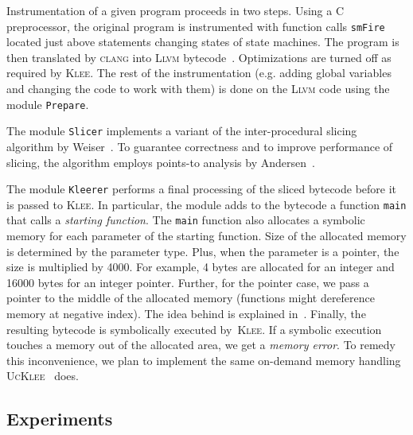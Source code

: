 \documentclass[10pt]{llncs}
\newcommand{\todol}[1]{{\scriptsize{{\textcolor{red}{[#1]}}}}}
\begin{document}
Instrumentation of a given program proceeds in two steps. Using a C
preprocessor, the original program is instrumented with function calls
\texttt{smFire} located just above statements changing states of state
machines. The program is then translated by \textsc{clang} into \textsc{Llvm}
bytecode~\cite{llvm}. Optimizations are turned off as required by
\textsc{Klee}. The rest of the instrumentation (e.g. adding global variables
and changing the code to work with them) is done on the \textsc{Llvm} code
using the module \texttt{Prepare}.

The module \texttt{Slicer} implements a variant of the inter-procedural
slicing algorithm by Weiser~\cite{Wei84}. To guarantee correctness and to
improve performance of slicing, the algorithm employs points-to analysis by
Andersen~\cite{andersen}.

The module \texttt{Kleerer} performs a final processing of the sliced
bytecode before it is passed to \textsc{Klee}. In particular, the module
adds to the bytecode a function \texttt{main} that calls a \emph{starting
function}.  The \texttt{main} function also allocates a symbolic memory for
each parameter of the starting function. Size of the allocated memory is
determined by the parameter type. Plus, when the parameter is a pointer, the
size is multiplied by 4000. For example, 4 bytes are allocated for an integer
and 16000 bytes for an integer pointer. Further, for the pointer case, we pass
a pointer to the middle of the allocated memory (functions might dereference
memory at negative index). The idea behind is explained in~\cite{ucklee}.
Finally, the resulting bytecode is symbolically executed by~\textsc{Klee}. If
a symbolic execution touches a memory out of the allocated area, we get a
\emph{memory error}. To remedy this inconvenience, we plan to implement the
same on-demand memory handling \textsc{UcKlee}~\cite{ucklee} does.


\subsection{Experiments}
\label{ssec:experiments}
\end{document}
